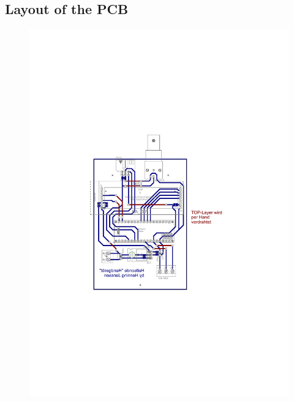 \documentclass[twoside,accentcolor=tud2a,nochapname,11pt]{tudexercise}
\begin{document}
\subsection{Layout of the PCB}
\label{app:board}
\begin{figure}[h]%
\centering
\includegraphics[angle=90]{../Layout/Hallsonde_board}%
\end{figure}
\end{document}
